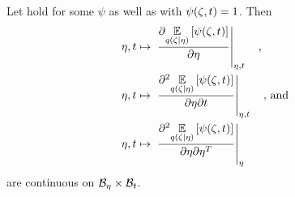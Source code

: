 





\begin{lem}
%
Let  hold for some $\psi$ as well as with $\psi(\zeta,
t) = 1$.  Then
%
\begin{align*}
%
\eta, \t \mapsto{}& \fracat{\partial
\expect{\q(\zeta \vert \eta)} {\psi(\zeta, \t)}}{\partial \eta}{\eta, \t}
%
\mathtxt{,}\\
%
\eta, \t \mapsto{}& \fracat{\partial^2
\expect{\q(\zeta \vert \eta)} {\psi(\zeta, \t)}}{\partial \eta \partial
\t}{\eta, \t}
%
\mathtxt{, and}\\
%
\eta, \t \mapsto{}&  \fracat{\partial^2
\expect{\q(\zeta \vert \eta)} {\psi(\zeta, \t)}}{\partial \eta \partial
\eta^T}{\eta}
%
\end{align*}
%
are continuous on $\mathcal{B}_\eta \times \mathcal{B}_t$.
%
\end{lem}

